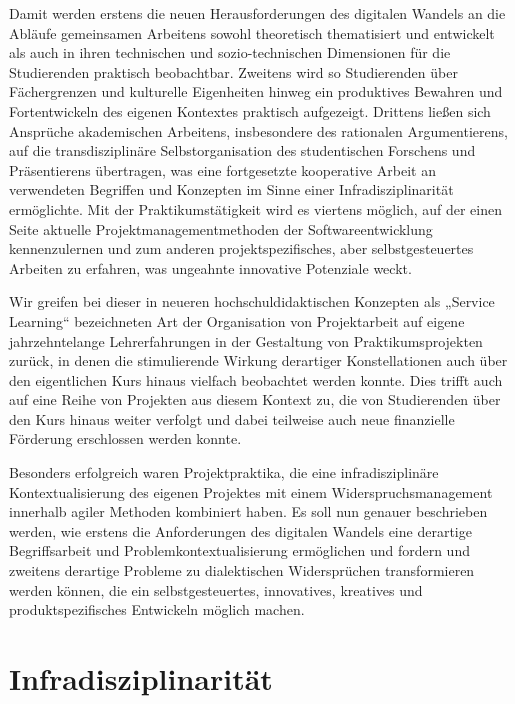 \documentclass[a4paper,11pt]{article}
\begin{document}
Damit werden erstens die neuen Herausforderungen des digitalen Wandels an die
Abläufe gemeinsamen Arbeitens sowohl theoretisch thematisiert und entwickelt
als auch in ihren technischen und sozio-technischen Dimensionen für die
Studierenden praktisch beobachtbar. Zweitens wird so Studierenden über
Fächergrenzen und kulturelle Eigenheiten hinweg ein produktives Bewahren und
Fortentwickeln des eigenen Kontextes praktisch aufgezeigt. Drittens ließen
sich Ansprüche akademischen Arbeitens, insbesondere des rationalen
Argumentierens, auf die transdisziplinäre Selbstorganisation des studentischen
Forschens und Präsentierens übertragen, was eine fortgesetzte kooperative
Arbeit an verwendeten Begriffen und Konzepten im Sinne einer
Infradisziplinarität ermöglichte. Mit der Praktikumstätigkeit wird es viertens
möglich, auf der einen Seite aktuelle Projektmanagementmethoden der
Softwareentwicklung kennenzulernen und zum anderen projektspezifisches, aber
selbstgesteuertes Arbeiten zu erfahren, was ungeahnte innovative Potenziale
weckt.

Wir greifen bei dieser in neueren hochschuldidaktischen Konzepten als „Service
Learning“ bezeichneten Art der Organisation von Projektarbeit auf eigene
jahrzehntelange Lehrerfahrungen in der Gestaltung von Praktikumsprojekten
zurück, in denen die stimulierende Wirkung derartiger Konstellationen auch
über den eigentlichen Kurs hinaus vielfach beobachtet werden konnte. Dies
trifft auch auf eine Reihe von Projekten aus diesem Kontext zu, die von
Studierenden über den Kurs hinaus weiter verfolgt und dabei teilweise auch
neue finanzielle Förderung erschlossen werden konnte.

Besonders erfolgreich waren Projektpraktika, die eine infradisziplinäre
Kontextualisierung des eigenen Projektes mit einem Widerspruchsmanagement
innerhalb agiler Methoden kombiniert haben. Es soll nun genauer beschrieben
werden, wie erstens die Anforderungen des digitalen Wandels eine derartige
Begriffsarbeit und Problemkontextualisierung ermöglichen und fordern und
zweitens derartige Probleme zu dialektischen Widersprüchen transformieren
werden können, die ein selbstgesteuertes, innovatives, kreatives und
produktspezifisches Entwickeln möglich machen.

\section{Infradisziplinarität}
\end{document}
